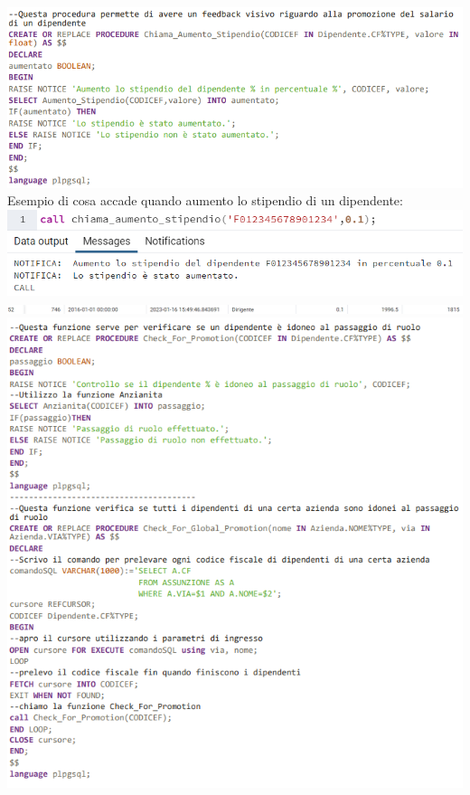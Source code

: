 \includegraphics[width=1\textwidth]{Immagini/chiama_aum.sql.png}
Esempio di cosa accade quando aumento lo stipendio di un dipendente:
\newline\newline
\includegraphics[width=1\textwidth]{Immagini/aum_es.png}
\includegraphics[width=1\textwidth]{Immagini/aum_es2.png}
\newline\newline
\includegraphics[width=1.2\textwidth]{Immagini/idoneopass.sql}
